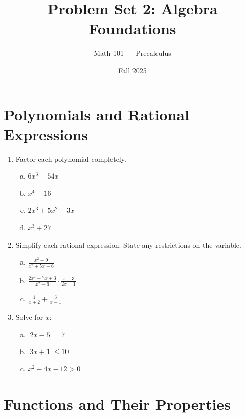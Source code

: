\documentclass[11pt]{article}
\title{Problem Set 2: Algebra Foundations}
\author{Math 101 --- Precalculus}
\date{Fall 2025}
\begin{document}
\maketitle

\section*{Polynomials and Rational Expressions}

\begin{enumerate}
\item Factor each polynomial completely.
\begin{enumerate}[(a)]
  \item $6x^3 - 54x$
  \item $x^4 - 16$
  \item $2x^3 + 5x^2 - 3x$
  \item $x^3 + 27$
\end{enumerate}

\item Simplify each rational expression. State any restrictions on the variable.
\begin{enumerate}[(a)]
  \item $\displaystyle \frac{x^2 - 9}{x^2 + 5x + 6}$

  \item $\displaystyle \frac{2x^2 + 7x + 3}{x^2 - 9} \cdot \frac{x - 3}{2x + 1}$

  \item $\displaystyle \frac{1}{x + 2} + \frac{3}{x - 1}$
\end{enumerate}

\item Solve for $x$:
\begin{enumerate}[(a)]
  \item $|2x - 5| = 7$
  \item $|3x + 1| \leq 10$
  \item $x^2 - 4x - 12 > 0$
\end{enumerate}
\end{enumerate}

\section*{Functions and Their Properties}
\end{document}
